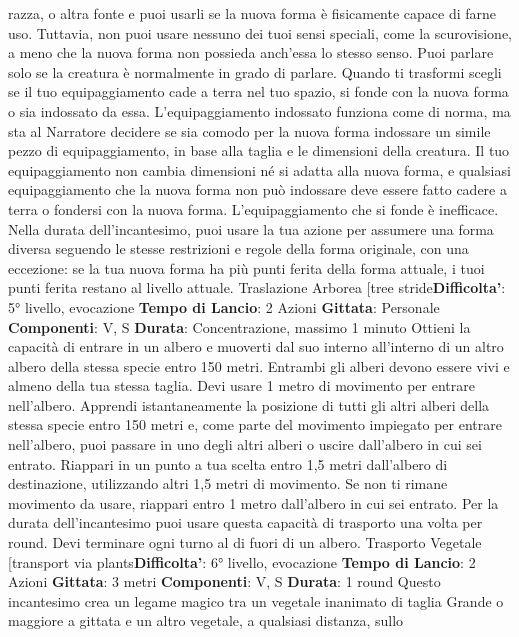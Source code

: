 \begin{multicols}{2}
razza, o altra fonte e puoi usarli se la nuova forma è
fisicamente capace di farne uso. Tuttavia, non puoi
usare nessuno dei tuoi sensi speciali, come la
scurovisione, a meno che la nuova forma non possieda
anch’essa lo stesso senso. Puoi parlare solo se la
creatura è normalmente in grado di parlare.
Quando ti trasformi scegli se il tuo equipaggiamento
cade a terra nel tuo spazio, si fonde con la nuova forma
o sia indossato da essa. L’equipaggiamento indossato
funziona come di norma, ma sta al Narratore decidere se sia
comodo per la nuova forma indossare un simile pezzo
di equipaggiamento, in base alla taglia e le dimensioni
della creatura. Il tuo equipaggiamento non cambia
dimensioni né si adatta alla nuova forma, e qualsiasi
equipaggiamento che la nuova forma non può
indossare deve essere fatto cadere a terra o fondersi
con la nuova forma. L’equipaggiamento che si fonde è
inefficace.
Nella durata dell’incantesimo, puoi usare la tua azione
per assumere una forma diversa seguendo le stesse
restrizioni e regole della forma originale, con una
eccezione: se la tua nuova forma ha più punti ferita
della forma attuale, i tuoi punti ferita restano al livello
attuale.
Traslazione Arborea
[tree stride\textbf{Difficolta'}:
5° livello, evocazione
\textbf{Tempo di Lancio}: 2 Azioni
\textbf{Gittata}: Personale
\textbf{Componenti}: V, S
\textbf{Durata}: Concentrazione, massimo 1 minuto
Ottieni la capacità di entrare in un albero e muoverti dal
suo interno all’interno di un altro albero della stessa
specie entro 150 metri. Entrambi gli alberi devono
essere vivi e almeno della tua stessa taglia. Devi usare
1 metro di movimento per entrare nell’albero. Apprendi
istantaneamente la posizione di tutti gli altri alberi della
stessa specie entro 150 metri e, come parte del
movimento impiegato per entrare nell’albero, puoi
passare in uno degli altri alberi o uscire dall’albero in cui
sei entrato. Riappari in un punto a tua scelta entro 1,5
metri dall’albero di destinazione, utilizzando altri 1,5
metri di movimento. Se non ti rimane movimento da
usare, riappari entro 1 metro dall’albero in cui sei
entrato.
Per la durata dell’incantesimo puoi usare questa
capacità di trasporto una volta per round. Devi
terminare ogni turno al di fuori di un albero.
Trasporto Vegetale
[transport via plants\textbf{Difficolta'}:
6° livello, evocazione
\textbf{Tempo di Lancio}: 2 Azioni
\textbf{Gittata}: 3 metri
\textbf{Componenti}: V, S
\textbf{Durata}: 1 round
Questo incantesimo crea un legame magico tra un
vegetale inanimato di taglia Grande o maggiore a
gittata e un altro vegetale, a qualsiasi distanza, sullo

\end{multicols}
